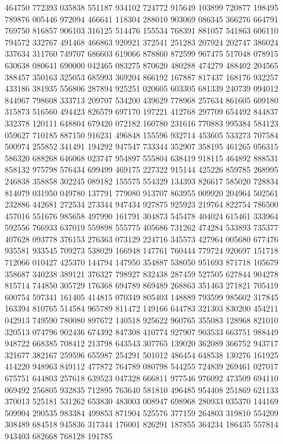 {464750 772393 035838 551187 934102 724772 915649 103899 720877 198495 789876%
005446 972094 466641 118304 288010 903069 086345 366276 664791 769750 816857%
906103 316125 514476 155534 768391 881057 541863 606110 794572 332767 491468%
466863 920921 372541 251283 207924 202747 386024 337634 311760 749707 686603%
619066 878860 872599 967475 517048 078915 630638 080641 690000 042465 083275%
870620 480288 474279 488402 204565 388457 350163 325053 685993 369204 866192%
167887 817437 168176 932257 433186 381935 556806 287894 925251 020605 603305%
681339 240739 094012 844967 798608 333713 209707 534200 439629 778968 257634%
861605 609180 315873 516560 494423 826579 697170 197221 412768 297709 654492%
844837 332378 120111 648804 679420 072182 160780 231616 770883 995384 584123%
059627 710185 887150 916231 496848 155596 932714 453605 533273 707584 500974%
255852 341491 194292 947547 733344 352907 358195 461265 056315 586320 688268%
646068 023747 954897 555804 638419 918115 464892 888531 858132 975798 576434%
699499 469175 227322 915144 425226 859785 268995 246838 358858 302245 089182%
155575 554329 134393 826617 585020 728834 814079 031950 049780 137791 779080%
913707 863955 009920 204964 502561 232886 442681 272534 273344 947434 927875%
925923 219764 822754 786500 457016 551676 985658 497990 161791 304873 545478%
404024 615461 333964 592556 766933 637019 559898 555775 405686 731262 474284%
533893 735377 407628 093778 376153 276363 073129 224716 345573 427964 005680%
677476 935581 933545 709273 538029 166948 147761 760444 779724 920697 151718%
712066 010427 425370 144794 147950 354887 538050 951693 871718 105679 358687%
340238 389121 376327 798927 832438 287459 527505 627844 904278 815714 744850%
305729 176368 694789 869489 268863 351463 271821 705419 600754 597341 161405%
414815 070349 805403 148889 793599 985602 317845 163394 810765 514584 965789%
811472 149166 644783 321303 830200 454211 042913 749590 780080 897672 140518%
925622 960765 355083 128968 821010 320513 074796 902436 674392 847308 410774%
927907 903533 663751 988449 948722 668385 708412 213798 643543 307765 139020%
362089 366752 943717 321677 382167 259596 655987 254291 501012 486454 648538%
130276 161925 414220 948963 849112 477872 764789 080798 544255 724839 269461%
027017 675751 644803 257618 639523 047328 666811 977546 976092 473509 694110%
069492 256805 932835 712895 763640 581810 496485 954408 251869 621133 370013%
525181 531262 653830 483003 008947 698968 280933 035370 144169 509904 290535%
983384 499853 871904 525576 377159 264803 319810 554209 308489 684518 945836%
317344 176001 826291 187855 364234 186435 557814 943403 682668 768128 191785%
}
